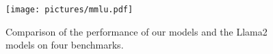 
\begin{figure}[tb]
\vskip 0.2in
\begin{center}
\centerline{\texttt{[image: pictures/mmlu.pdf]}}
\caption{Comparison of the performance of our models and the Llama2 models on four benchmarks.}
\label{mmlu}
\end{center}
\vskip -0.3in
\end{figure}